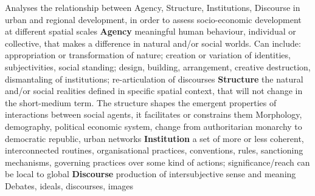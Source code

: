 \documentclass{article}
\begin{document}
\begin{outline}
	\1 Analyses the relationship between Agency, Structure, Institutions, Discourse in urban and regional development, in order to assess socio-economic development at different spatial scales
	\1 \textbf{Agency} meaningful human behaviour, individual or collective, that makes a difference in natural and/or social worlds. Can include: appropriation or transformation of nature; creation or variation of identities, subjectivities, social standing; design, building, arrangement, creative destruction, dismantaling of institutions; re-articulation of discourses
	\1 \textbf{Structure} the natural and/or social realities defined in specific spatial context, that will not change in the short-medium term. The structure shapes the emergent properties of interactions between social agents, it facilitates or constrains them
		\2  Morphology, demography, political economic system, change from authoritarian monarchy to democratic republic, urban networks
	\1 \textbf{Institution} a set of more or less coherent, interconnected routines, organisational practices, conventions, rules, sanctioning mechanisms, governing practices over some kind of actions; significance/reach can be local to global
	\1 \textbf{Discourse} production of intersubjective sense and meaning
		\2 Debates, ideals, discourses, images
\end{outline}


\begin{comment}
\begin{chronology}[10]{1900}{2010}{100ex}[\textwidth]
\event{1930}{Bismarckian (pioneers)}
\event{1960}{Beveridgian (divergence)}
\event{1997}{Convergence}
\end{chronology}
\end{comment}

\printbibliography
\end{document}
